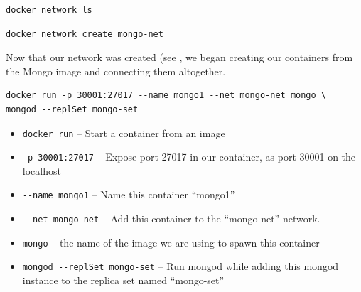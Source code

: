 \documentclass{article}
\begin{document}
\begin{tcolorbox}[colback=CrispBlue!5!white,colframe=CrispBlue!75!black,title=List all networks created in Docker]
\begin{verbatim}    
docker network ls
\end{verbatim}
\end{tcolorbox}

\begin{tcolorbox}[colback=CrispBlue!5!white,colframe=CrispBlue!75!black,title=Create our user-defined network]
\begin{verbatim}
docker network create mongo-net
\end{verbatim}
\end{tcolorbox}


\newpage
Now that our network was created (see , we began creating our containers from the Mongo image and connecting them altogether.

\begin{tcolorbox}[colback=CrispBlue!5!white,colframe=CrispBlue!75!black,title=Create first MongoDB image]    
\begin{verbatim}
docker run -p 30001:27017 --name mongo1 --net mongo-net mongo \
mongod --replSet mongo-set
\end{verbatim}
\end{tcolorbox}

\begin{itemize}
    \item \verb|docker run| -- Start a container from an image
    \item \verb|-p 30001:27017| -- Expose port 27017 in our container, as port 30001 on the localhost
    \item \verb|--name mongo1| -- Name this container ``mongo1''
    \item \verb|--net mongo-net| -- Add this container to the ``mongo-net'' network.
    \item \verb|mongo| -- the name of the image we are using to spawn this container
    \item \verb|mongod --replSet mongo-set| -- Run mongod while adding this mongod instance to the replica set named ``mongo-set''
\end{itemize}
\end{document}
